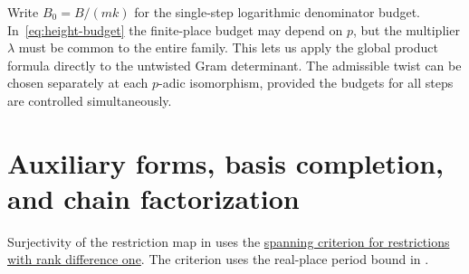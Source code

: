 Write $B_0=B/(mk)$ for the single-step logarithmic denominator budget. In~\eqref{eq:height-budget} the finite-place budget may depend on $p$, but the multiplier $\lambda$ must be common to the entire family. This lets us apply the global product formula directly to the untwisted Gram determinant. The admissible twist can be chosen separately at each $p$-adic isomorphism, provided the budgets for all steps are controlled simultaneously.

\section{Auxiliary forms, basis completion, and chain factorization}
\label{sec:c-chain}

Surjectivity of the restriction map in  uses the \hyperref[use:ch8-restriction]{spanning criterion for restrictions with rank difference one}. The criterion uses the real-place period bound in .

